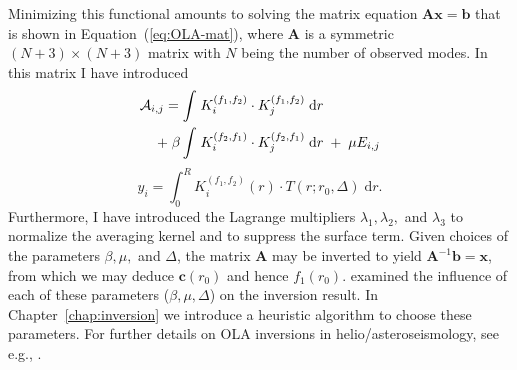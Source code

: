 Minimizing this functional amounts to solving the matrix equation ${\mathbf{A}\mathbf{x} = \mathbf{b}}$ that is shown in Equation~(\ref{eq:OLA-mat}), where $\mathbf{A}$ is a symmetric ${(N+3)\times (N+3)}$ matrix with $N$ being the number of observed modes. %
In this matrix I have introduced
\begin{align}
    \mathcal{A}_{i,j} 
    = 
    \int &\; K_i^{(f_1, f_2)} \cdot K_j^{(f_1, f_2)} %
    \; \text{d}r 
    \notag\\\;+\;\beta \int &\; K_i^{(f_2, f_1)} \cdot K_j^{(f_2, f_1)} \; \text{d}r 
    \; + \; \mu E_{i,j}
\end{align}
\begin{equation}
        y_i%
        = 
        \int_0^R K_i^{(f_1, f_2)}(r) \cdot T(r; r_0, \Delta) \; \text{d}r. 
\end{equation}
Furthermore, I have introduced the Lagrange multipliers $\lambda_1, \lambda_2,$ and $\lambda_3$ to normalize the averaging kernel and to suppress the surface term. 
Given choices of the parameters $\beta, \mu,$ and $\Delta$, the matrix $\mathbf{A}$ may be inverted %
to yield ${\mathbf{A}^{-1}\mathbf{b}=\mathbf{x}}$, from which we may deduce ${\mathbf c(r_0)}$ and hence ${f_1(r_0)}$. 
\citet{1998esasp.418..505r,1999MNRAS.309...35R} examined the influence of each of these parameters ($\beta, \mu, \Delta$) on the inversion result. 
In Chapter~\ref{chap:inversion} we introduce a heuristic algorithm to choose these parameters. 
For further details on OLA inversions in helio/asteroseismology, see e.g., \citet{basuchaplin2017}. 


